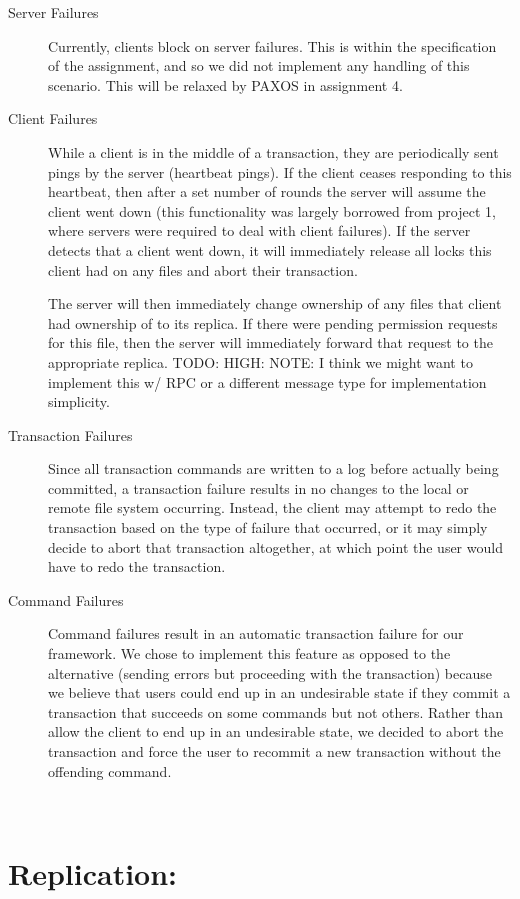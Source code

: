 \documentclass[11pt]{article}
\begin{document}
\begin{description}
\item[Server Failures] Currently, clients block on server failures. This is within the specification of the assignment, and so we did not implement any handling of this scenario. This will be relaxed by PAXOS in assignment 4.
\item[Client Failures] While a client is in the middle of a transaction, they are periodically sent pings by the server (heartbeat pings). If the client ceases responding to this heartbeat, then after a set number of rounds the server will assume the client went down (this functionality was largely borrowed from project 1, where servers were required to deal with client failures). If the server detects that a client went down, it will immediately release all locks this client had on any files and abort their transaction.

The server will then immediately change ownership of any files that client had ownership of to its replica. If there were pending permission requests for this file, then the server will immediately forward that request to the appropriate replica. TODO: HIGH: NOTE: I think we might want to implement this w/ RPC or a different message type for implementation simplicity.
\item[Transaction Failures] Since all transaction commands are written to a log before actually being committed, a transaction failure results in no changes to the local or remote file system occurring. Instead, the client
may attempt to redo the transaction based on the type of failure that occurred, or it may simply decide to abort that transaction altogether, at which point the user would have to redo the transaction. 
\item[Command Failures] Command failures result in an automatic transaction failure for our framework. We chose to implement this feature as opposed to the alternative (sending errors but proceeding with the transaction) because we believe that users could end up in an undesirable state if they commit a transaction that succeeds on some commands but not others. Rather than allow the client to end up in an undesirable state, we decided to abort the transaction and force the user to recommit a new transaction without the offending command.
\end{description}
\\

\section{Replication:} \\
\end{document}
